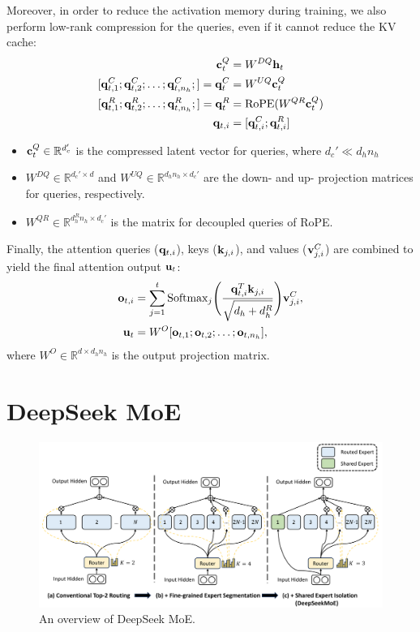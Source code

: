 Moreover, in order to reduce the activation memory during training, we also perform low-rank compression for the queries, even if it cannot reduce the KV cache:
\begin{align*}
	\rvc_t^{Q} &= W^{DQ}\rvh_t\\
	[\rvq_{t,1}^C; \rvq_{t,2}^C; \dots ;\rvq_{t,n_h}^C;] = \rvq_t^{C} &= W^{UQ}\rvc_t^{Q}\\
	[\rvq_{t,1}^R; \rvq_{t,2}^R; \dots ;\rvq_{t,n_h}^R;] = \rvq_t^{R} &= \text{RoPE}(W^{QR}\rvc_t^Q)\\
	\rvq_{t,i} &= [\rvq_{t,i}^C;\rvq_{t,i}^{R}]
\end{align*}
\begin{itemize}
	\item ${\mathbf{c}}_t^{Q}\in \mathbb{R}^{d_c'}$ is the compressed latent vector for queries, where $d_c'\ll d_hn_h$
	\item $W^{DQ}\in \mathbb{R}^{d_c'\times d}$ and $W^{UQ}\in \mathbb{R}^{d_hn_h\times d_c'}$ are the down- and up- projection matrices for queries, respectively.
	\item $W^{QR}\in \mathbb{R}^{d_h^Rn_h\times d_c'}$ is the matrix for decoupled queries of RoPE.
\end{itemize}

Finally, the attention queries (${\mathbf{q}}_{t,i}$), keys (${\mathbf{k}}_{j,i}$), and values (${\mathbf{v}}_{j,i}^C$) are combined to yield the final attention output ${\mathbf{u}}_t$:
\begin{align*}
	{\mathbf{o}}_{t,i} &= \sum_{j=1}^t\text{Softmax}_j\Bigg( \frac{{\mathbf{q}}_{t,i}^T{\mathbf{k}}_{j,i}}{\sqrt{d_h+d_h^R}} \Bigg){\mathbf{v}}_{j,i}^C,\\
	{\mathbf{u}}_t &= W^O[{\mathbf{o}}_{t,1};{\mathbf{o}}_{t,2};\dots;{\mathbf{o}}_{t,n_h}],
\end{align*}
where $W^O\in \mathbb{R}^{d\times d_hn_h}$ is the output projection matrix.


\section{DeepSeek MoE}

\begin{figure}[t]
	\centering
	\includegraphics[scale=0.4]{./images/DeepSeek/deepseek_moe.png}
	\caption{An overview of DeepSeek MoE.}
	\label{fig:}
\end{figure}


